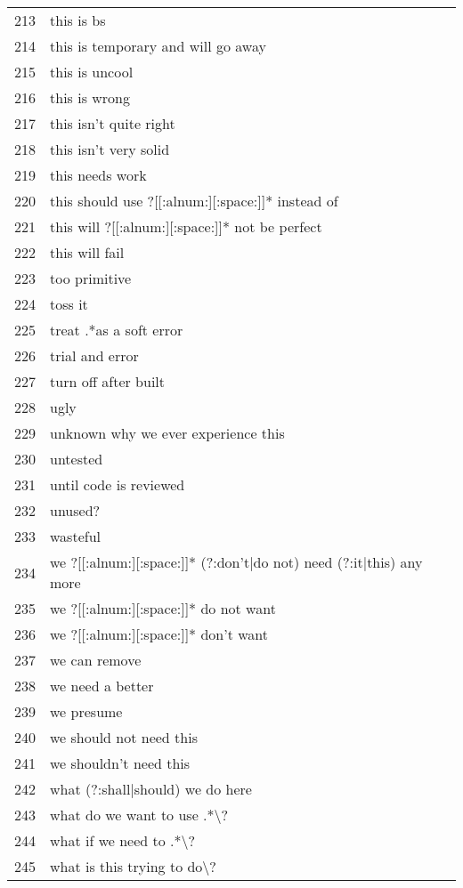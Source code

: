 \begin{longtable}{r|l}
213 & this is bs\\
214 & this is temporary and will go away\\
215 & this is uncool\\
216 & this is wrong\\
217 & this isn't quite right\\
218 & this isn't very solid\\
219 & this needs work\\
220 & this should use ?[[:alnum:][:space:]]* instead of\\
221 & this will ?[[:alnum:][:space:]]* not be perfect\\
222 & this will fail\\
223 & too primitive\\
224 & toss it\\
225 & treat .*as a soft error\\
226 & trial and error\\
227 & turn off after built\\
228 & ugly\\
229 & unknown why we ever experience this\\
230 & untested\\
231 & until code is reviewed\\
232 & unused?\\
233 & wasteful\\
234 & we ?[[:alnum:][:space:]]* (?:don't|do not) need (?:it|this) any more\\
235 & we ?[[:alnum:][:space:]]* do not want\\
236 & we ?[[:alnum:][:space:]]* don't want\\
237 & we can remove\\
238 & we need a better\\
239 & we presume\\
240 & we should not need this\\
241 & we shouldn't need this\\
242 & what (?:shall|should) we do here\\
243 & what do we want to use .*\textbackslash{}?\\
244 & what if we need to .*\textbackslash{}?\\
245 & what is this trying to do\textbackslash{}?\\

\end{longtable}
